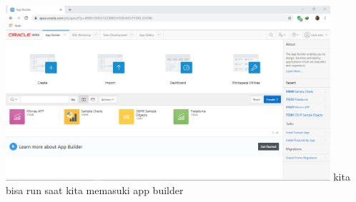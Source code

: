 \documentclass[12pt, times news roman, a4paper] {article}
\begin{document}
\\
\begin{minipage}{\linewidth}
	\centering
	\includegraphics[width=12cm]{Gambar5.png} 
	 {kita bisa run saat kita memasuki app builder}
\end{minipage}
\end{document}

